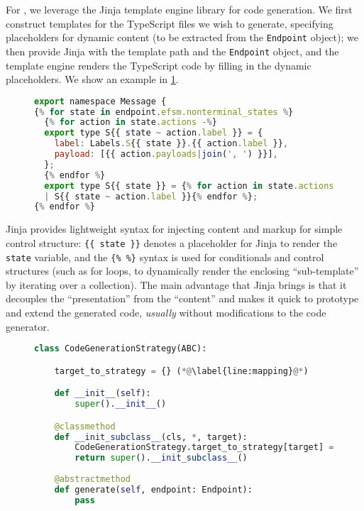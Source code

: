For , we leverage the Jinja \cite{jinja} 
template engine library for code generation. 
We first construct templates for the TypeScript files we wish to generate,
specifying placeholders for dynamic content (to be extracted
from the \texttt{Endpoint} object); 
we then provide Jinja with the template path and the 
\texttt{Endpoint} object, and the template engine renders the
TypeScript code by filling in the dynamic placeholders. 
We show an example in \cref{lst:jinja}.

\begin{figure}[!ht]
\begin{lstlisting}[language=javascript, title=efsm.ts.j2]
export namespace Message {
{% for state in endpoint.efsm.nonterminal_states %}
  {% for action in state.actions -%}
  export type S{{ state ~ action.label }} = {
    label: Labels.S{{ state }}.{{ action.label }},
    payload: [{{ action.payloads|join(', ') }}],
  };
  {% endfor %}
  export type S{{ state }} = {% for action in state.actions -%}
  | S{{ state ~ action.label }}{% endfor %};
{% endfor %}
\end{lstlisting}
\label{lst:jinja}
\end{figure}

Jinja provides lightweight syntax for injecting content and
markup for simple control structure: \texttt{\{\{ state \}\}} 
denotes a placeholder for Jinja to render the \texttt{state} variable,
and the \texttt{\{\% \%\}} syntax  is used for conditionals and
control structures 
(such as for loops, to dynamically render the enclosing ``sub-template''
by iterating over a collection).
The main advantage that Jinja brings is that 
it decouples the ``presentation''
from the ``content'' and makes it quick to prototype and extend
the generated code, \textit{usually} without modifications to the 
code generator.

\begin{figure}[!ht]
\begin{lstlisting}[language=python]
class CodeGenerationStrategy(ABC):

    target_to_strategy = {} (*@\label{line:mapping}@*)

    def __init__(self):
        super().__init__()

    @classmethod
    def __init_subclass__(cls, *, target):
        CodeGenerationStrategy.target_to_strategy[target] = cls (*@\label{line:register}@*)
        return super().__init_subclass__()
    
    @abstractmethod
    def generate(self, endpoint: Endpoint):
        pass
\end{lstlisting}
\label{lst:codegenerationstrategy}
\end{figure}

